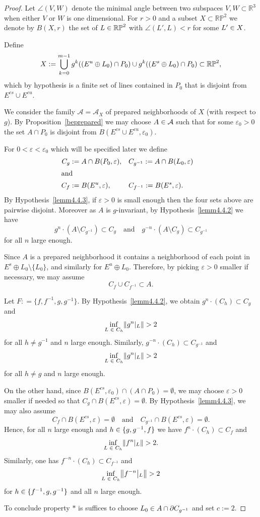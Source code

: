 \documentclass[AHL,Unicode,longabstracts]{cedram}
\newcommand{\clA}{\mathcal{A}}
\newcommand{\R}{\mathbb{R}}
\newcommand{\RR}{\R}
\newcommand{\eps}{\varepsilon}
\newcommand{\RP}{{\RR\mathbb{P}}}
\let\originalleft\left
\let\originalright\right
\renewcommand{\left}{\mathopen{}\mathclose\bgroup\originalleft}
\renewcommand{\right}{\aftergroup\egroup\originalright}
\let\oldin\in
\renewcommand{\in}{\mathchoice{\oldin}{\oldin}{\,\oldin\,}{\,\oldin\,}}
\newcommand{\RR}{\mathbb{R}}
\begin{document}
\begin{proof}
Let $\angle(V,W)$ denote the minimal angle between two subspaces $V,W \subset \R^3$ when either $V$ or $W$ is one dimensional. For $r>0$ and a subset $X \subset \RP^2$ we denote by $B(X,r)$ the set of $L \in \RP^2$ with $\angle(L',L) < r$ for some $L' \in X$.

Define
\[
X := \bigcup_{k = 0}^{m-1} g^k\left((E^u \oplus L_0) \cap P_0\right) \cup g^k\left((E^s \oplus L_0) \cap P_0\right)\subset\RP^2,
\]
which by hypothesis is a finite set of lines contained in $P_0$ that is disjoint from $E^{cs} \cup E^{cu}$.

We consider the family $\clA=\clA_X$ of prepared neighborhoods of $X$ (with respect to $g$). By Proposition~\ref{beprepared} we may choose $A\in\clA$ such that for some $\eps_0 > 0$ the set $A \cap P_0$ is disjoint from $B(E^{cs}\cup E^{cu},\eps_0)$.

For $0 < \eps < \eps_0$ which will be specified later we define
\begin{align*}
C_g &:= A \cap B(P_0,\eps), &&C_{g^{-1}} := A \cap B(L_0,\eps) &&
\\
\intertext{and}
C_f &:= B(E^{u},\eps), &&C_{f^{-1}} := B(E^{s},\eps). &&
\end{align*}
By Hypothesis~\eqref{lemm4.4.3}, if $\eps > 0$ is small enough then the four sets above are pairwise disjoint.
Moreover as $A$ is $g$-invariant, by Hypothesis~\eqref{lemm4.4.2} we have
\[
g^{n}\cdot(A \setminus C_{g^{-1}}) \subset C_g \quad\text{and}\quad g^{-n}\cdot(A \setminus C_{g}) \subset C_{g^{-1}}
\]
for all $n$ large enough.

Since $A$ is a prepared neighborhood it contains a neighborhood of each point in $E^s \oplus L_0\setminus\{L_0\}$, and similarly for $E^{u} \oplus L_0$. Therefore, by picking $\eps > 0$ smaller if necessary, we may assume
\[
C_f \cup C_{f^{-1}} \subset A.
\]

Let $F: = \{ f,f^{-1},g,g^{-1}\}$. By Hypothesis~\eqref{lemm4.4.2}, we obtain $g^{n}\cdot(C_h) \subset C_g$ and
\[
\inf\limits_{L \in C_h}\left\|g^n\vert_{L}\right\| > 2
\]
for all $h \neq g^{-1}$ and $n$ large enough. Similarly, $g^{-n}\cdot(C_h) \subset C_{g^{-1}}$ and
\[
\inf\limits_{L \in C_h}\left\|g^n\vert_{L}\right\| > 2
\]
for all $h \neq g$ and $n$ large enough.

On the other hand, since $B(E^{cs},\eps_0) \cap (A \cap P_0) = \emptyset$, we may choose $\eps > 0$ smaller if needed so that $C_g \cap B(E^{cs},\eps) = \emptyset$. By Hypothesis~\eqref{lemm4.4.3}, we may also assume
\[
C_f\cap B(E^{cs},\eps) = \emptyset \quad\text{and}\quad C_{g^{-1}} \cap B(E^{cs},\eps) = \emptyset.
\]
Hence, for all $n$ large enough and $h \in\{ g,g^{-1},f\}$ we have $f^n\cdot (C_h) \subset C_f$ and
\[
\inf\limits_{L \in C_h}\left\|f^n\middle\vert_{L}\right\| > 2.
\]
Similarly, one has $f^{-n}\cdot (C_h) \subset C_{f^{-1}}$ and
\[
\inf\limits_{L \in C_h}\left\|f^{-n}\middle\vert_{L}\right\| > 2
\]
for $h \in\{ f^{-1},g,g^{-1}\}$ and all $n$ large enough.

To conclude property $\ast$ is suffices to choose $L_0 \in A \cap \partial C_{g^{-1}}$ and set $c := 2$.
\end{proof}
\end{document}
